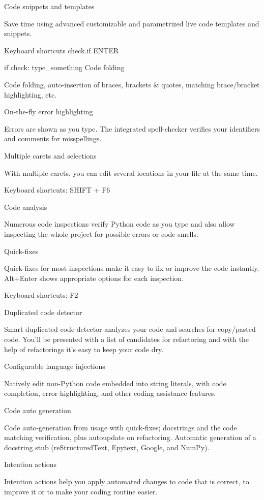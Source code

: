 Code snippets and templates

Save time using advanced customizable and parametrized live code templates and snippets.

Keyboard shortcuts check.if ENTER

if check:
  type_something
Code folding

Code folding, auto-insertion of braces, brackets & quotes, matching brace/bracket highlighting, etc.

On-the-fly error highlighting

Errors are shown as you type. The integrated spell-checker verifies your identifiers and comments for misspellings.

Multiple carets and selections

With multiple carets, you can edit several locations in your file at the same time.

Keyboard shortcuts: SHIFT + F6

Code analysis

Numerous code inspections verify Python code as you type and also allow inspecting the whole project for possible errors or code smells.

Quick-fixes

Quick-fixes for most inspections make it easy to fix or improve the code instantly. Alt+Enter shows appropriate options for each inspection.

Keyboard shortcuts: F2

Duplicated code detector

Smart duplicated code detector analyzes your code and searches for copy/pasted code. You'll be presented with a list of candidates for refactoring and with the help of refactorings it's easy to keep your code dry.

Configurable language injections

Natively edit non-Python code embedded into string literals, with code completion, error-highlighting, and other coding assistance features.

Code auto generation

Code auto-generation from usage with quick-fixes; docstrings and the code matching verification, plus autoupdate on refactoring. Automatic generation of a docstring stub (reStructuredText, Epytext, Google, and NumPy).

Intention actions

Intention actions help you apply automated changes to code that is correct, to improve it or to make your coding routine easier.

